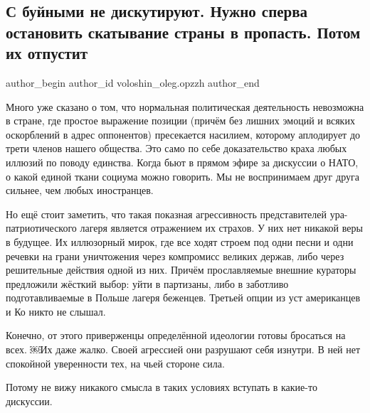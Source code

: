  
 
 
 
 
 
\subsection{С буйными не дискутируют. Нужно сперва остановить скатывание страны в пропасть. Потом их отпустит}
\label{sec:19_02_2022.fb.voloshin_oleg.opzzh.1.s_bujnymi_ne_diskutirujut}
 
\ifcmt
 author_begin
   author_id voloshin_oleg.opzzh
 author_end
\fi

Много уже сказано о том, что нормальная политическая деятельность невозможна в
стране, где простое выражение позиции (причём без лишних эмоций и всяких
оскорблений в адрес оппонентов) пресекается насилием, которому аплодирует до
трети членов нашего общества. Это само по себе доказательство краха любых
иллюзий по поводу единства. Когда бьют в прямом эфире за дискуссии о НАТО, о
какой единой ткани социума можно говорить. Мы не воспринимаем друг друга
сильнее, чем любых иностранцев. 

Но ещё стоит заметить, что такая показная агрессивность представителей
ура-патриотического лагеря является отражением их страхов. У них нет никакой
веры в будущее. Их иллюзорный мирок, где все ходят строем под одни песни и одни
речевки на грани уничтожения через компромисс великих держав, либо через
решительные действия одной из них. Причём прославляемые внешние кураторы
предложили жёсткий выбор: уйти в партизаны, либо в заботливо подготавливаемые в
Польше лагеря беженцев. Третьей опции из уст американцев и Ко никто не слышал. 

Конечно, от этого приверженцы определённой идеологии готовы бросаться на всех.
￼Их даже жалко. Своей агрессией они разрушают себя изнутри. В ней нет спокойной
уверенности тех, на чьей стороне сила.

Потому не вижу никакого смысла в таких условиях вступать в какие-то дискуссии.

